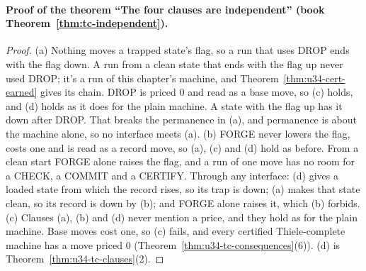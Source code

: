 \documentclass[11pt,twoside]{article}
\theoremstyle{thielethm}
\theoremstyle{thieledef}
\theoremstyle{thieledef}
\theoremstyle{thieledef}
\theoremstyle{thielethm}
\theoremstyle{thieleobs}
\theoremstyle{thielethm}
\begin{document}
\paragraph{Proof of the theorem ``The four clauses are independent'' (book Theorem~\ref{thm:tc-independent}).}
\begin{proof}
(a) Nothing moves a trapped state's flag, so a run that uses DROP ends with the flag down. A run
from a clean state that ends with the flag up never used DROP; it's a run of this chapter's
machine, and Theorem~\ref{thm:u34-cert-earned} gives its chain. DROP is priced 0 and read as a base
move, so (c) holds, and (d) holds as it does for the plain machine. A state with the flag up has
it down after DROP. That breaks the permanence in (a), and permanence is about the machine alone,
so no interface meets (a). (b) FORGE never lowers the flag, costs one and is read as a record move,
so (a), (c) and (d) hold as before. From a clean start FORGE alone raises the flag, and a run of
one move has no room for a CHECK, a COMMIT and a CERTIFY. Through any interface: (d) gives a
loaded state from which the record rises, so its trap is down; (a) makes that state clean, so its
record is down by (b); and FORGE alone raises it, which (b) forbids. (c) Clauses (a), (b) and (d)
never mention a price, and they hold as for the plain machine. Base moves cost one, so (c) fails,
and every certified Thiele-complete machine has a move priced 0 (Theorem~\ref{thm:u34-tc-consequences}(6)). (d)
is Theorem~\ref{thm:u34-tc-clauses}(2).
\end{proof}
\end{document}
